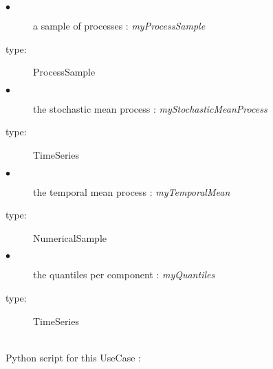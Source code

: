 {
  \begin{description}
  \item[$\bullet$] a sample of processes : {\itshape myProcessSample}
  \item[type:]  ProcessSample
  \end{description}

  \begin{description}
  \item[$\bullet$] the stochastic mean process : {\itshape myStochasticMeanProcess}
  \item[type:] TimeSeries
  \end{description}

  \begin{description}
  \item[$\bullet$] the temporal mean process : {\itshape myTemporalMean}
  \item[type:] NumericalSample
  \end{description}

  \begin{description}
  \item[$\bullet$] the quantiles per component : {\itshape myQuantiles}
  \item[type:] TimeSeries
  \end{description}
}

\textspace\\
Python script for this UseCase :


